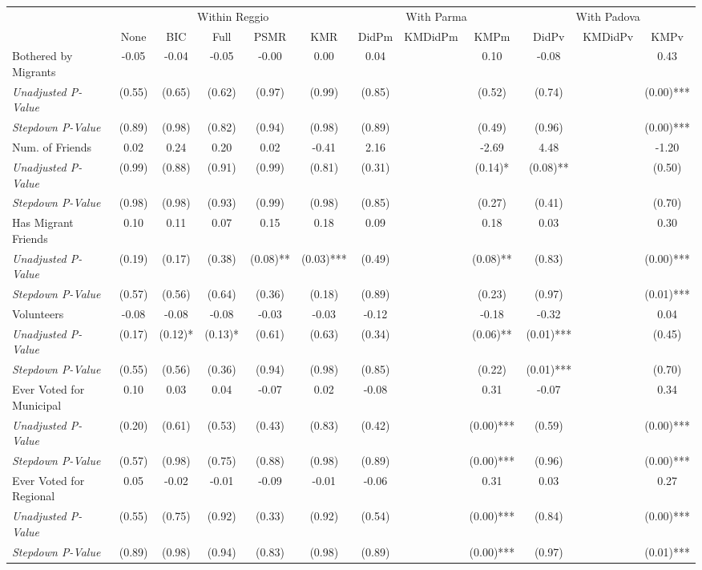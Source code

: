 \begin{tabular}{l c c c c c c c c c c c}
\toprule
& \multicolumn{5}{c}{Within Reggio} & \multicolumn{3}{c}{With Parma} & \multicolumn{3}{c}{With Padova} \\\cmidrule(lr){2-6} \cmidrule(lr){7-9} \cmidrule(lr){10-12}
 & None & BIC & Full & PSMR & KMR & DidPm & KMDidPm & KMPm & DidPv & KMDidPv & KMPv \\
\midrule
Bothered by Migrants & -0.05 & -0.04 & -0.05 & -0.00 & 0.00 & 0.04 & & 0.10 & -0.08 & & 0.43 \\
\quad \textit{Unadjusted P-Value} & (0.55) & (0.65) & (0.62) & (0.97) & (0.99) & (0.85) & & (0.52) & (0.74) & & (0.00)*** \\
\quad \textit{Stepdown P-Value} & (0.89) & (0.98) & (0.82) & (0.94) & (0.98) & (0.89) & & (0.49) & (0.96) & & (0.00)*** \\
Num. of Friends & 0.02 & 0.24 & 0.20 & 0.02 & -0.41 & 2.16 & & -2.69 & 4.48 & & -1.20 \\
\quad \textit{Unadjusted P-Value} & (0.99) & (0.88) & (0.91) & (0.99) & (0.81) & (0.31) & & (0.14)* & (0.08)** & & (0.50) \\
\quad \textit{Stepdown P-Value} & (0.98) & (0.98) & (0.93) & (0.99) & (0.98) & (0.85) & & (0.27) & (0.41) & & (0.70) \\
Has Migrant Friends & 0.10 & 0.11 & 0.07 & 0.15 & 0.18 & 0.09 & & 0.18 & 0.03 & & 0.30 \\
\quad \textit{Unadjusted P-Value} & (0.19) & (0.17) & (0.38) & (0.08)** & (0.03)*** & (0.49) & & (0.08)** & (0.83) & & (0.00)*** \\
\quad \textit{Stepdown P-Value} & (0.57) & (0.56) & (0.64) & (0.36) & (0.18) & (0.89) & & (0.23) & (0.97) & & (0.01)*** \\
Volunteers & -0.08 & -0.08 & -0.08 & -0.03 & -0.03 & -0.12 & & -0.18 & -0.32 & & 0.04 \\
\quad \textit{Unadjusted P-Value} & (0.17) & (0.12)* & (0.13)* & (0.61) & (0.63) & (0.34) & & (0.06)** & (0.01)*** & & (0.45) \\
\quad \textit{Stepdown P-Value} & (0.55) & (0.56) & (0.36) & (0.94) & (0.98) & (0.85) & & (0.22) & (0.01)*** & & (0.70) \\
Ever Voted for Municipal & 0.10 & 0.03 & 0.04 & -0.07 & 0.02 & -0.08 & & 0.31 & -0.07 & & 0.34 \\
\quad \textit{Unadjusted P-Value} & (0.20) & (0.61) & (0.53) & (0.43) & (0.83) & (0.42) & & (0.00)*** & (0.59) & & (0.00)*** \\
\quad \textit{Stepdown P-Value} & (0.57) & (0.98) & (0.75) & (0.88) & (0.98) & (0.89) & & (0.00)*** & (0.96) & & (0.00)*** \\
Ever Voted for Regional & 0.05 & -0.02 & -0.01 & -0.09 & -0.01 & -0.06 & & 0.31 & 0.03 & & 0.27 \\
\quad \textit{Unadjusted P-Value} & (0.55) & (0.75) & (0.92) & (0.33) & (0.92) & (0.54) & & (0.00)*** & (0.84) & & (0.00)*** \\
\quad \textit{Stepdown P-Value} & (0.89) & (0.98) & (0.94) & (0.83) & (0.98) & (0.89) & & (0.00)*** & (0.97) & & (0.01)*** \\
\bottomrule
\end{tabular}
